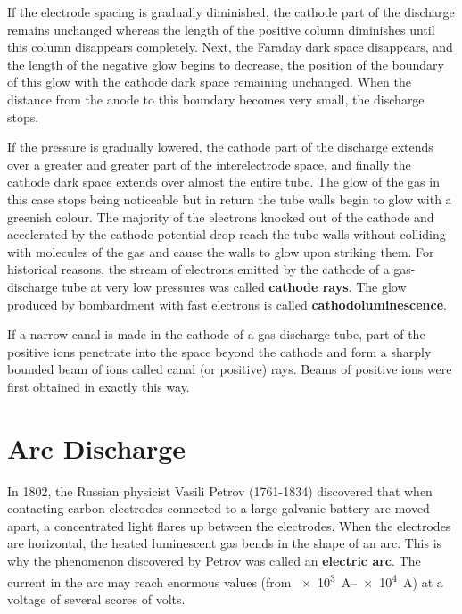If the electrode spacing is gradually diminished, the cathode part of the discharge remains unchanged whereas the length of the positive column diminishes until this column disappears completely.
Next, the Faraday dark space disappears, and the length of the negative glow begins to decrease, the position of the boundary of this glow with the cathode dark space remaining unchanged.
When the distance from the anode to this boundary becomes very small, the discharge stops.

If the pressure is gradually lowered, the cathode part of the discharge extends over a greater and greater part of the interelectrode space, and finally the cathode dark space extends over almost the entire tube.
The glow of the gas in this case stops being noticeable but in return the tube walls begin to glow with a greenish colour.
The majority of the electrons knocked out of the cathode and accelerated by the cathode potential drop reach the tube walls without colliding with molecules of the gas and cause the walls to glow upon
striking them.
For historical reasons, the stream of electrons emitted by the cathode of a gas-discharge tube at very low pressures was called \textbf{cathode rays}.
The glow produced by bombardment with fast electrons
is called \textbf{cathodoluminescence}.

If a narrow canal is made in the cathode of a gas-discharge tube, part of the positive ions penetrate into the space beyond the cathode and form a sharply bounded beam of ions called canal (or positive) rays.
Beams of positive ions were first obtained in exactly this way.

\section{Arc Discharge}\label{sec:12_7}

In 1802, the Russian physicist Vasili Petrov (1761-1834) discovered that when contacting carbon electrodes connected to a large galvanic battery are moved apart, a concentrated light flares up between
the electrodes.
When the electrodes are horizontal, the heated luminescent gas bends in the shape of an arc.
This is why the phenomenon discovered by Petrov was called an \textbf{electric arc}.
The current in the arc may reach enormous values (from \SIrange{e3}{e4}{\ampere}) at a voltage
of several scores of volts.

